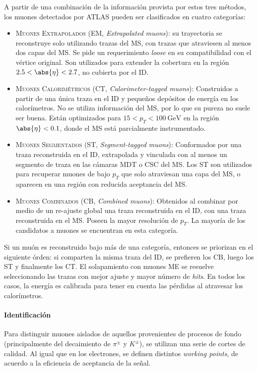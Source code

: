 A partir de una combinación de la información provista por estos tres métodos, los muones detectados por ATLAS pueden ser clasificados en cuatro categorías:
\begin{itemize}
    \item \textsc{Muones Extrapolados} (EM, \textit{Extrapolated muons}): su trayectoria se reconstruye solo utilizando trazas del MS, con trazas que atraviesen al menos dos capas del MS. Se pide un requerimiento \textit{loose} en su compatibilidad con el vértice original. Son utilizados para extender la cobertura en la región $2.5 < \abs{\eta} < 2.7$, no cubierta por el ID.
    \item \textsc{Muones Calorimétricos} (CT, \textit{Calorimeter-tagged muons}): Construidos a partir de una única traza en el ID y pequeños depósitos de energía en los calorímetros. No se utiliza información del MS, por lo que su pureza no suele ser buena. Están optimizados para $15 < p_T < \SI{100}{\GeV}$ en la región $\abs{\eta} < 0.1$, donde el MS está parcialmente instrumentado.
    \item \textsc{Muones Segmentados} (ST, \textit{Segment-tagged muons}): Conformados por una traza reconstruida en el ID, extrapolada y vinculada con al menos un segmento de traza en las cámaras MDT o CSC del MS. Los ST son utilizados para recuperar muones de bajo $p_T$ que solo atraviesan una capa del MS, o aparecen en una región con reducida aceptancia del MS.
    \item \textsc{Muones Combinados} (CB, \textit{Combined muons}): Obtenidos al combinar por medio de un re-ajuste global una traza reconstruida en el ID, con una traza reconstruida en el MS. Poseen la mayor resolución de $p_T$. La mayoría de los candidatos a muones se encuentran en esta categoría.
\end{itemize}

Si un muón es reconstruido bajo más de una categoría, entonces se priorizan en el siguiente órden: si comparten la misma traza del ID, se prefieren los CB, luego los ST y finalmente los CT. El solapamiento con muones ME se resuelve seleccionando las trazas con mejor ajuste y mayor número de \textit{hits}. En todos los casos, la energía es calibrada para tener en cuenta las pérdidas al atravesar los calorímetros. 


\paragraph{Identificación}

Para distinguir muones aislados de aquellos provenientes de procesos de fondo (principalmente del decaimiento de $\pi^\pm$ y $K^\pm$), se utilizan una serie de cortes de calidad. Al igual que en los electrones, se definen distintos \textit{working points}, de acuerdo a la eficiencia de aceptancia de la señal.

